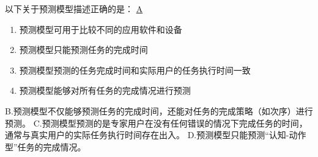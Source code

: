 \begin{problem}
	以下关于预测模型描述正确的是：
	\uline{A}    
        \begin{enumerate}[label=\Alph*.]
            \item 预测模型可用于比较不同的应用软件和设备
            \item 预测模型只能预测任务的完成时间
            \item 预测模型预测的任务完成时间和实际用户的任务执行时间一致
            \item 预测模型能够对所有任务的完成情况进行预测
        \end{enumerate}
\end{problem}

\begin{solution}
B.预测模型不仅能够预测任务的完成时间，还能对任务的完成策略（如次序）进行预测。  C.预测模型预测的是专家用户在没有任何错误的情况下完成任务的时间，通常与真实用户的实际任务执行时间存在出入。  D.预测模型只能预测“认知-动作型”任务的完成情况。
\end{solution}